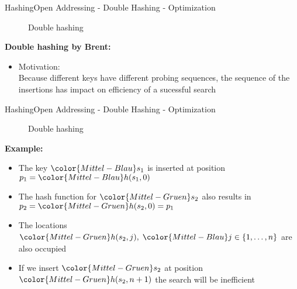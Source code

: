 \begin{frame}{Hashing}{Open Addressing - Double Hashing - Optimization}
  \vspace{-2.0em}
  \begin{figure}[!h]
    \begin{adjustbox}{width=0.9\linewidth}%
    \end{adjustbox}
    \vspace{-1.0em}
    \caption{Double hashing}%
    \label{fig:hashing:open_addressing:double_hashing_no_brent}%
  \end{figure}
  \textbf{Double hashing by Brent:}
  \begin{itemize}
    \item<2-> Motivation:\\
      Because different keys have different probing sequences,
      the sequence of the insertions has impact on efficiency of a sucessful search
  \end{itemize}
\end{frame}


\begin{frame}{Hashing}{Open Addressing - Double Hashing - Optimization}
  \vspace{-2.0em}
  \begin{figure}[!h]
    \begin{adjustbox}{width=0.9\linewidth}%
    \end{adjustbox}
    \vspace{-1.0em}
    \caption{Double hashing}%
    \label{fig:hashing:open_addressing:double_hashing_no_brent2}%
  \end{figure}
  \vspace{-1.0em}
  \textbf{Example:}
  \begin{itemize}
    \item<2->
      The key ${\color{Mittel-Blau}s_1}$ is inserted at position
      \begin{math}
        p_1 = {\color{Mittel-Blau}h(s_1, 0)}
      \end{math}
    \item<3->
      The hash function for ${\color{Mittel-Gruen}s_2}$ also results in
      \begin{math}
        p_2 = {\color{Mittel-Gruen}h(s_2, 0)} = p_1
      \end{math}
    \item<4->
      The locations
      \begin{math}
        {\color{Mittel-Gruen}h(s_2, j)}, \;
        {\color{Mittel-Blau}j} \in \{1,\dots,n\}
      \end{math}
      are also occupied
    \item<5->
      If we insert ${\color{Mittel-Gruen}s_2}$ at position
      ${\color{Mittel-Gruen}h(s_2, n + 1)}$ the search will be inefficient
  \end{itemize}
\end{frame}

